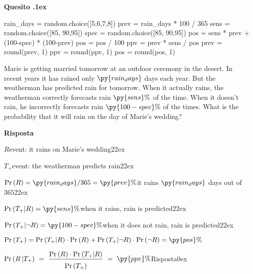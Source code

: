 \documentclass[11pt,twoside,a4paper]{article}
\newcounter{quesito}
\newenvironment{question}{\addtocounter{quesito}{1}\bigskip\bigskip\par\textbf{Quesito \thequesito.\kern1ex}}{\vspace{\parskip}}
\newenvironment{answer}{\par\textbf{Risposta\quad}}{\vspace{\parskip}}
\begin{document}
\begin{question}
\def\Pr{{\rm Pr\,}}
\begin{pycode}
rain_days = random.choice([5,6,7,8])
prev = rain_days * 100 / 365
sens =  random.choice([85, 90,95])
spec = random.choice([85, 90,95])
pos =  sens * prev + (100-spec) * (100-prev)
pos = pos / 100
ppv =  prev * sens  / pos
prev = round(prev, 1)
ppv = round(ppv, 1)
pos = round(pos, 1)
\end{pycode}
Marie is getting married tomorrow at an outdoor ceremony in the desert. In recent years it has rained only $\py{rain_days}$ days each year. But the weatherman has predicted rain for tomorrow. When it actually rains, the weatherman correctly forecasts rain $\py{sens}\%$ of the time. When it doesn’t rain, he incorrectly forecasts rain $\py{100-spec}\%$ of the times. What is the probability that it will rain on the day of Marie’s wedding?

\begin{answer}

$R$\hfill event: it rains on Marie’s wedding\kern22ex

$T_+$\hfill event: the weatherman predicts rain\kern22ex

$\Pr(R) =\py{rain_days}/365 = \py{prev}\%$\hfill it rains $\py{rain_days}$ days out of $365$\kern22ex

$\Pr(T_+|R) = \py{sens}\%$\hfill when it rains, rain is predicted\kern22ex

$\Pr(T_+|\neg R) = \py{100-spec}\%$\hfill when it does not rain,  rain is predicted\kern22ex

$\Pr(T_+) = \Pr(T_+|R)\cdot \Pr(R)+ \Pr(T_+|\neg R)\cdot \Pr(\neg R) = \py{pos}\%$ 

$\displaystyle \Pr(R\,| T_+)\ =\ \frac{\Pr(R)\cdot \Pr(T_+|R)}{\Pr(T_+)\vphantom{\Big[}}\ =\kern1ex${\color{blue}$\py{ppv}\%$\hfill Risposta\kern0ex}

\end{answer}
\end{question}
\end{document}
